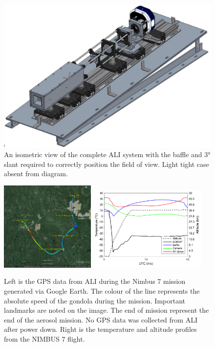 \documentclass[12pt]{article}
\begin{document}
\begin{figure}
        \centering
        \includegraphics[width=1.0\textwidth]{./Images/3-3-AliCompleteDesign.pdf}
        \caption{An isometric view of the complete ALI system with the baffle and 3\si{\degree} slant required to correctly position the field of view. Light tight case absent from diagram.}
        \label{fig:3.3:aliSystemDiagram}
\end{figure}

\newpage

\begin{figure}
    \includegraphics[width=0.42\textwidth]{./Images/5-1-AliGpsDataGoogleMaps.jpg}
    \includegraphics[width=0.52\textwidth]{./Images/5-1-FlightTemperatures.pdf}
    \caption{Left is the GPS data from ALI during the Nimbus 7 mission generated via Google Earth. The colour of the line represents the absolute speed of the gondola during the mission. Important landmarks are noted on the image. The end of mission represent the end of the aerosol mission. No GPS data was collected from ALI after power down. Right is the temperature and altitude profiles from the NIMBUS 7 flight.}
    \label{fig:5.1:nimbus7FlightPath}
\end{figure}
\end{document}
